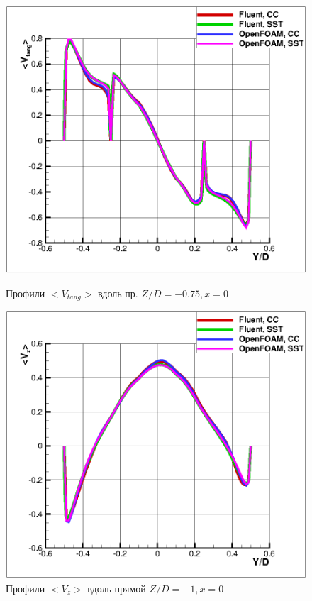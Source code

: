 \begin{figure}[h]
\begin{minipage}{0.475\linewidth}
		\includegraphics[scale=0.66]{tangentialCyclone}
		\caption{Профили $<V_{tang}>$ вдоль пр. $Z/D=-0.75, x=0$}
		\label{fig:tangentialCyclone}
	\end{minipage}
	\begin{minipage}{0.475\linewidth}
		\includegraphics[scale=0.66]{axialCyclone2}
		\caption{Профили $<V_{z}>$ вдоль прямой $Z/D=-1, x=0$}
		\label{fig:axialCyclone2}
	\end{minipage}

\end{figure}
